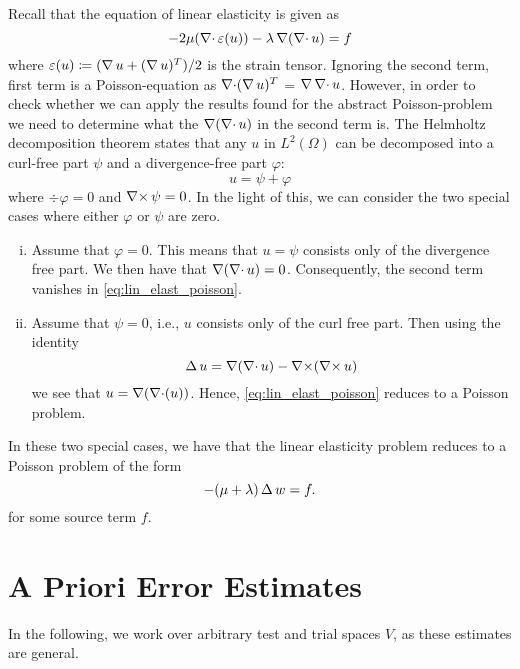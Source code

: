 Recall that the equation of linear elasticity is given as
\begin{equation}
    \label{eq:lin_elast_poisson}
    - 2 \mu ( \operatorname{\mathop{}\!\nabla \cdot} \varepsilon(u)) - \lambda \operatorname{\mathop{}\!\nabla}(\operatorname{\mathop{}\!\nabla \cdot} u) = f
\end{equation}
where \(\varepsilon(u) \coloneqq (\operatorname{\mathop{}\!\nabla} u + (\operatorname{\mathop{}\!\nabla} u)^T) / 2 \) is the strain
tensor. Ignoring the second term, first term is a Poisson-equation as \(\operatorname{\mathop{}\!\nabla \cdot}
(\operatorname{\mathop{}\!\nabla} u)^T\) = \( \operatorname{\mathop{}\!\nabla} \operatorname{\mathop{}\!\nabla \cdot} u \).  However, in order to check whether we can
apply the results found for the abstract Poisson-problem we need to determine
what the \( \operatorname{\mathop{}\!\nabla} (\operatorname{\mathop{}\!\nabla \cdot} u) \) in the second term is. The Helmholtz
decomposition theorem states that any \( u \) in \( L^2(\Omega) \) can be
decomposed into a curl-free part \( \psi \)  and a divergence-free part \(
\varphi \):
\begin{equation}
    u = \psi + \varphi 
\end{equation}
where \(\div \varphi = 0\) and \(  \operatorname{\mathop{}\!\nabla \times} \psi = 0 \).  In the light of this, we
can consider the two special cases where either \( \varphi \) or \( \psi \) are
zero. 
\begin{enumerate}[(i)]
    \item Assume that \( \varphi = 0 \). This means that \( u = \psi \)
        consists only of the divergence free part. We then have that
        \(\operatorname{\mathop{}\!\nabla}(\operatorname{\mathop{}\!\nabla \cdot} u) = 0 \). Consequently, the second term vanishes in
        \cref{eq:lin_elast_poisson}.
    \item Assume that \( \psi = 0 \), i.e., \( u \) consists only of the curl
        free part. Then using the identity
        \begin{equation}
            \operatorname{\mathop{}\!\Delta} u = \operatorname{\mathop{}\!\nabla}(\operatorname{\mathop{}\!\nabla \cdot} u) - \operatorname{\mathop{}\!\nabla \times}(\operatorname{\mathop{}\!\nabla \times} u)
        \end{equation}
        we see that \( u = \operatorname{\mathop{}\!\nabla}(\operatorname{\mathop{}\!\nabla \cdot}(u)) \). Hence,
        \cref{eq:lin_elast_poisson} reduces to a Poisson problem.
\end{enumerate}
In these two special cases, we have that the linear elasticity problem reduces
to a Poisson problem of the form
\begin{equation}
    -(\mu + \lambda)\operatorname{\mathop{}\!\Delta} w = f.
\end{equation}
for some source term \( f \).

\section{A Priori Error Estimates}
\label{sec:a_priori_estimates}

In the following, we work over arbitrary test and trial spaces \( V \), as
these estimates are general.

